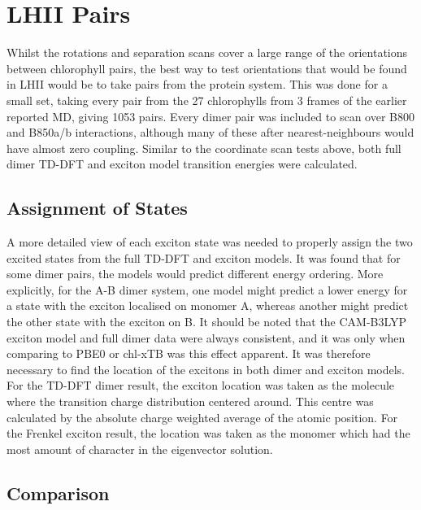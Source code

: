 \afterpartskip

\section{LHII Pairs}
\label{sec:LHII_excitons}

Whilst the rotations and separation scans cover a large range of the orientations
between chlorophyll pairs, the best way to test orientations that would be found
in LHII would be to take pairs from the protein system. This was done for a small 
set, taking every pair from the 27 chlorophylls from 3 frames of the earlier reported
MD, giving 1053 pairs. Every dimer pair was included to scan over B800 and B850a/b
interactions, although many of these after nearest-neighbours would have almost 
zero coupling. Similar to the coordinate scan tests above, both full dimer TD-DFT 
and exciton model transition energies were calculated.

\subsection{Assignment of States}
\label{subsec:state_assign}

A more detailed view of each exciton state was needed to properly assign the two
excited states from the full TD-DFT and exciton models. It was found that for some
dimer pairs, the models would predict different energy ordering. More explicitly, 
for the A-B dimer system, one model might predict a lower energy for a state with
the exciton localised on monomer A, whereas another might predict the other state
with the exciton on B. It should be noted that the CAM-B3LYP exciton model and full
dimer data were always consistent, and it was only when comparing to PBE0 or chl-xTB
was this effect apparent.
It was therefore necessary to find the location of the excitons in both dimer and
exciton models. For the TD-DFT dimer result, the exciton location was taken as the
molecule where the transition charge distribution centered around. This centre was
calculated by the absolute charge weighted average of the atomic position. For the
Frenkel exciton result, the location was taken as the monomer which had the most
amount of character in the eigenvector solution.

\subsection{Comparison}
\label{subsec:comparison}

